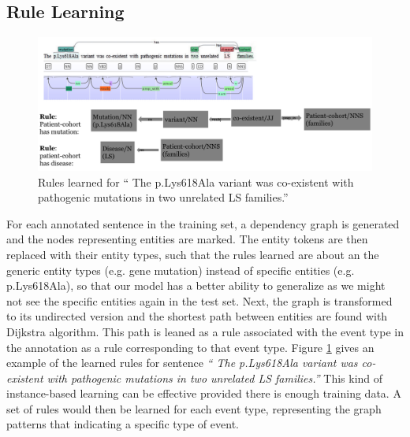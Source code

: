 \subsection{Rule Learning}
	\begin{figure}
		\centering
		\includegraphics[width=\textwidth]{Rule}
		\caption{Rules learned for `` The p.Lys618Ala variant was co-existent with pathogenic mutations in two unrelated LS families.''}
		\label{fig:Rule}   
	\end{figure}
For each annotated sentence in the training set, a dependency graph is generated and the nodes representing entities are marked. The entity tokens are then replaced with their entity types, such that the rules learned are about an the generic entity types (e.g. gene mutation) instead of specific entities (e.g. p.Lys618Ala), so that our model has a better ability to generalize as we might not see the specific entities again in the test set. Next, the graph is transformed to its undirected version and the shortest path between entities are found with Dijkstra algorithm. This path is leaned as a rule associated with the event type in the annotation as a rule corresponding to that event type. Figure \ref{fig:Rule} gives an example of the learned rules for sentence \emph{`` The p.Lys618Ala variant was co-existent with pathogenic mutations in two unrelated LS families.''} This kind of instance-based learning can be effective provided there is enough training data\cite{alpaydin2014introduction}. A set of rules would then be learned for each event type, representing the graph patterns that indicating a specific type of event. 
